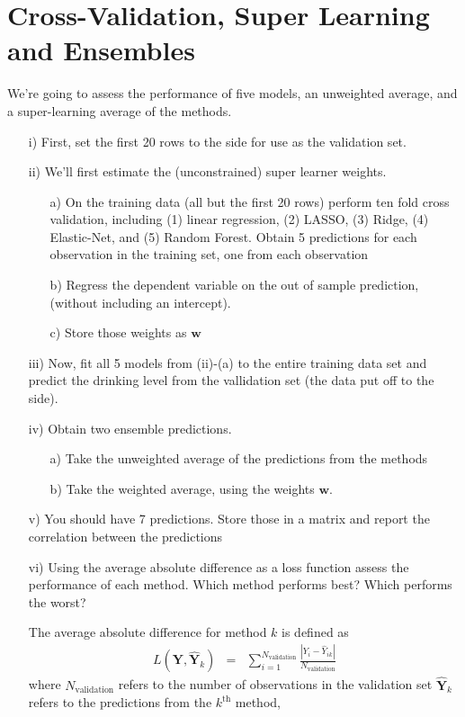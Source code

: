 \documentclass[letterpaper,12pt]{article}
\numberwithin{equation}{section}
\numberwithin{equation}{section}
\begin{document}
\section{Cross-Validation, Super Learning and Ensembles}

We're going to assess the performance of five models, an unweighted average, and a super-learning average of the methods.

\begin{itemize}
\item[i)] First, set the first 20 rows to the side for use as the validation set.
\item[ii)] We'll first estimate the (unconstrained) super learner weights.  
\begin{itemize}
\item[a)] On the training data (all but the first 20 rows) perform ten fold cross validation, including (1) linear regression, (2) LASSO, (3) Ridge, (4) Elastic-Net, and (5) Random Forest.  Obtain 5 predictions for each observation in the training set, one from each observation
\item[b)] Regress the dependent variable on the out of sample prediction, (without including an intercept).
\item[c)] Store those weights as $\boldsymbol{w}$
\end{itemize}
\item[iii)] Now, fit all 5 models from (ii)-(a) to the entire training data set and predict the drinking level from the vallidation set (the data put off to the side).
\item[iv)]   Obtain two ensemble predictions.  
\begin{itemize}
\item[a)] Take the unweighted average of the predictions from the methods
\item[b)] Take the weighted average, using the weights $\boldsymbol{w}$.
\end{itemize}
\item[v)] You should have 7 predictions. Store those in a matrix and report the correlation between the predictions
\item[vi)] Using the average absolute difference as a loss function assess the performance of each method.  Which method performs best?  Which performs the worst? 

\noindent The average absolute difference for method $k$ is defined as 
\begin{eqnarray}
L(\boldsymbol{Y}, \widehat{\boldsymbol{Y}}_{k}) & = & \sum_{i=1}^{N_{\text{validation}}} \frac{|Y_{i} - \widehat{Y}_{ik}| }{ N_{\text{validation}} }\nonumber 
\end{eqnarray}
where $N_{\text{validation}}$ refers to the number of observations in the validation set $\widehat{\boldsymbol{Y}}_{k}$ refers to the predictions from the $k^{\text{th}}$ method, 


\end{itemize}
\end{document}
